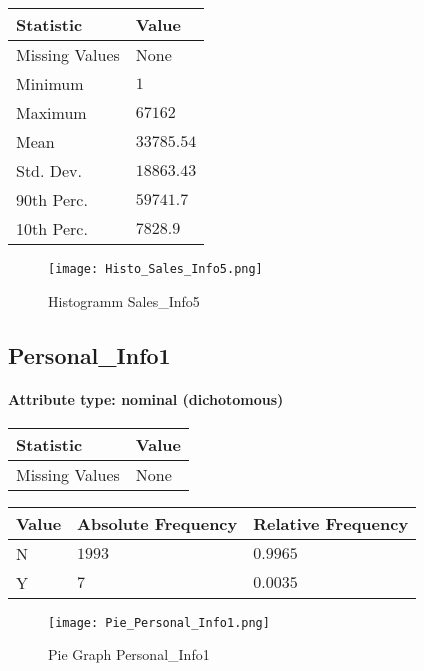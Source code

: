 \begin{table}[H]
	\renewcommand{\arraystretch}{1.25}
	\begin{tabular}{l|l}
		\textbf{Statistic} & \textbf{Value}\\\hline
		Missing Values& None\\\hline
		Minimum& $1$\\\hline
		Maximum& $67162$\\\hline
		Mean& $33785.54$\\\hline
		Std. Dev.& $18863.43$\\\hline
		90th Perc. & $59741.7$\\\hline
		10th Perc. & $7828.9$ \\		
	\end{tabular}
\end{table}
\begin{figure}[H]
	\begin{center}
		\texttt{[image: Histo\_Sales\_Info5.png]}
	\end{center}
	\caption{Histogramm Sales\_Info5}
\end{figure}

\subsection{Personal\_Info1}
\paragraph{Attribute type: nominal (dichotomous)}\quad

\begin{table}[H]
	\renewcommand{\arraystretch}{1.25}
	\begin{tabular}{l|l}
		\textbf{Statistic} & \textbf{Value}\\\hline
		Missing Values& None\\\hline
	\end{tabular}
\end{table}
\begin{table}[H]
	\renewcommand{\arraystretch}{1.25}
	\begin{tabular}{l|l|l}
		\textbf{Value} & \textbf{Absolute Frequency} & \textbf{Relative Frequency}\\\hline
		N&$1993$&$0.9965$\\\hline
		Y&$7$&$0.0035$
	\end{tabular}
\end{table}

\begin{figure}[H]
	\begin{center}
		\texttt{[image: Pie\_Personal\_Info1.png]}
	\end{center}
	\caption{Pie Graph Personal\_Info1}
\end{figure}

